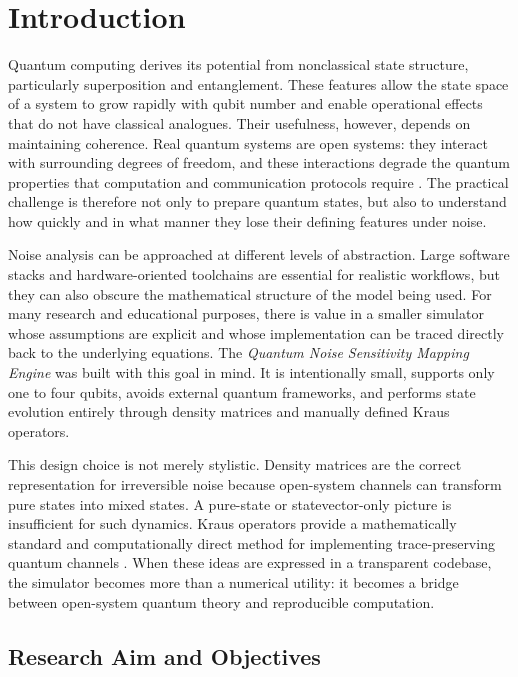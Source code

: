 \chapter{Introduction}

Quantum computing derives its potential from nonclassical state structure, particularly superposition and entanglement. These features allow the state space of a system to grow rapidly with qubit number and enable operational effects that do not have classical analogues. Their usefulness, however, depends on maintaining coherence. Real quantum systems are open systems: they interact with surrounding degrees of freedom, and these interactions degrade the quantum properties that computation and communication protocols require \cite{zurek2003decoherence}. The practical challenge is therefore not only to prepare quantum states, but also to understand how quickly and in what manner they lose their defining features under noise.

Noise analysis can be approached at different levels of abstraction. Large software stacks and hardware-oriented toolchains are essential for realistic workflows, but they can also obscure the mathematical structure of the model being used. For many research and educational purposes, there is value in a smaller simulator whose assumptions are explicit and whose implementation can be traced directly back to the underlying equations. The \emph{Quantum Noise Sensitivity Mapping Engine} was built with this goal in mind. It is intentionally small, supports only one to four qubits, avoids external quantum frameworks, and performs state evolution entirely through density matrices and manually defined Kraus operators.

This design choice is not merely stylistic. Density matrices are the correct representation for irreversible noise because open-system channels can transform pure states into mixed states. A pure-state or statevector-only picture is insufficient for such dynamics. Kraus operators provide a mathematically standard and computationally direct method for implementing trace-preserving quantum channels \cite{yu2006kraus}. When these ideas are expressed in a transparent codebase, the simulator becomes more than a numerical utility: it becomes a bridge between open-system quantum theory and reproducible computation.

\section{Research Aim and Objectives}


